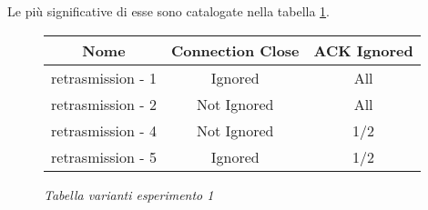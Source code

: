 Le più significative di esse sono catalogate nella tabella \ref{table-retransmission}.
\begin{figure}[!h]
    \centering
    \begin{tabular}{|c|c|c|}
        \hline
        \textbf{Nome} & \textbf{Connection Close} & \textbf{ACK Ignored} \\
        \hline
        retrasmission - 1  & Ignored & All \\
        \hline
        retrasmission - 2 & Not Ignored & All \\
        \hline
        retrasmission - 4 & Not Ignored & 1/2 \\
        \hline
        retrasmission - 5 & Ignored & 1/2 \\
        \hline
    \end{tabular}
    \caption{\emph{Tabella varianti esperimento 1}}
    \label{table-retransmission}
\end{figure}

